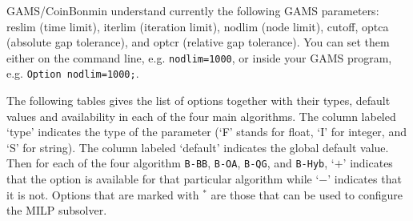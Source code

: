 GAMS/CoinBonmin understand currently the following GAMS parameters: reslim (time limit), iterlim (iteration limit), nodlim (node limit), cutoff, optca (absolute gap tolerance), and optcr (relative gap tolerance).
You can set them either on the command line, e.g. \verb+nodlim=1000+, or inside your GAMS program, e.g. \verb+Option nodlim=1000;+.

The following tables gives the list of options together with their types, default values and availability in each of the four main algorithms.
The column labeled `type' indicates the type of the parameter (`F' stands for float, `I' for integer, and `S' for
string).
The column labeled `default' indicates the global default value.
Then for each of the four algorithm \texttt{B-BB}, \texttt{B-OA}, \texttt{B-QG}, and \texttt{B-Hyb}, `$+$' indicates that the option is available for that particular algorithm while `$-$' indicates that it is not.
Options that are marked with $^*$ are those that can be used to configure the MILP subsolver.

